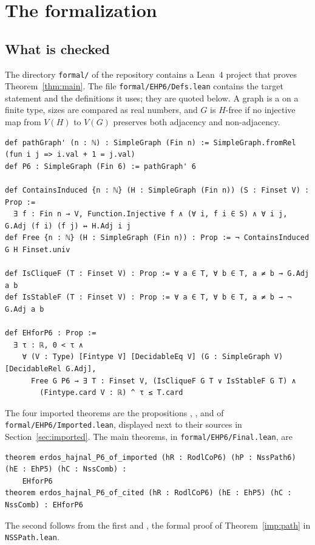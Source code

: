 \section{The formalization}\label{sec:formal}

\subsection{What is checked}
The directory \texttt{formal/} of the repository \repo{} contains a Lean~4 project that proves
Theorem~\ref{thm:main}. The file \texttt{formal/EHP6/Defs.lean} contains the target statement and the
definitions it uses; they are quoted below. A graph is a  on a finite type, sizes are compared as
real numbers, and $G$ is $H$-free if no injective map from $V(H)$ to $V(G)$ preserves both adjacency
and non-adjacency.
\begin{lstlisting}
def pathGraph' (n : ℕ) : SimpleGraph (Fin n) := SimpleGraph.fromRel (fun i j => i.val + 1 = j.val)
def P6 : SimpleGraph (Fin 6) := pathGraph' 6

def ContainsInduced {n : ℕ} (H : SimpleGraph (Fin n)) (S : Finset V) : Prop :=
  ∃ f : Fin n → V, Function.Injective f ∧ (∀ i, f i ∈ S) ∧ ∀ i j, G.Adj (f i) (f j) ↔ H.Adj i j
def Free {n : ℕ} (H : SimpleGraph (Fin n)) : Prop := ¬ ContainsInduced G H Finset.univ

def IsCliqueF (T : Finset V) : Prop := ∀ a ∈ T, ∀ b ∈ T, a ≠ b → G.Adj a b
def IsStableF (T : Finset V) : Prop := ∀ a ∈ T, ∀ b ∈ T, a ≠ b → ¬ G.Adj a b

def EHforP6 : Prop :=
  ∃ τ : ℝ, 0 < τ ∧
    ∀ (V : Type) [Fintype V] [DecidableEq V] (G : SimpleGraph V) [DecidableRel G.Adj],
      Free G P6 → ∃ T : Finset V, (IsCliqueF G T ∨ IsStableF G T) ∧
        (Fintype.card V : ℝ) ^ τ ≤ T.card
\end{lstlisting}
The four imported theorems are the propositions , ,  and
 of \texttt{formal/EHP6/Imported.lean}, displayed next to their sources in
Section~\ref{sec:imported}. The main theorems, in \texttt{formal/EHP6/Final.lean}, are
\begin{lstlisting}
theorem erdos_hajnal_P6_of_imported (hR : RodlCoP6) (hP : NssPath6) (hE : EhP5) (hC : NssComb) :
    EHforP6
theorem erdos_hajnal_P6_of_cited (hR : RodlCoP6) (hE : EhP5) (hC : NssComb) : EHforP6
\end{lstlisting}
The second follows from the first and , the formal proof of
Theorem~\ref{imp:path} in \texttt{NSSPath.lean}.
